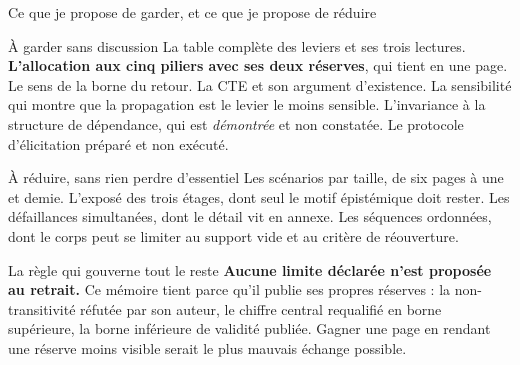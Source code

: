 \documentclass[11pt]{beamer}
\begin{document}
\begin{frame}{Ce que je propose de garder, et ce que je propose de réduire}
\scriptsize
\begin{block}{À garder sans discussion}
La table complète des leviers et ses trois lectures. \textbf{L'allocation aux cinq piliers avec
ses deux réserves}, qui tient en une page. Le sens de la borne du retour. La CTE et son argument
d'existence. La sensibilité qui montre que la propagation est le levier le moins sensible.
L'invariance à la structure de dépendance, qui est \emph{démontrée} et non constatée. Le
protocole d'élicitation préparé et non exécuté.
\end{block}
\vspace{-1.5mm}
\begin{block}{À réduire, sans rien perdre d'essentiel}
Les scénarios par taille, de six pages à une et demie. L'exposé des trois étages, dont seul le
motif épistémique doit rester. Les défaillances simultanées, dont le détail vit en annexe. Les
séquences ordonnées, dont le corps peut se limiter au support vide et au critère de réouverture.
\end{block}
\vspace{-1.5mm}
\begin{block}{La règle qui gouverne tout le reste}
\textbf{Aucune limite déclarée n'est proposée au retrait.} Ce mémoire tient parce qu'il publie
ses propres réserves : la non-transitivité réfutée par son auteur, le chiffre central requalifié
en borne supérieure, la borne inférieure de validité publiée. Gagner une page en rendant une
réserve moins visible serait le plus mauvais échange possible.
\end{block}
\end{frame}
\end{document}
